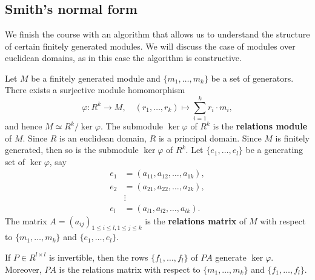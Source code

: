 \section{}

\subsection{Smith's normal form}

We finish the course with an algorithm that allows us to understand the
structure of certain finitely generated modules.  We will discuss the case of
modules over euclidean domains, as in this case the algorithm is constructive. 


Let $M$ be a finitely generated module and $\{m_1,\dots,m_k\}$ be a set of
generators.  There exists a surjective module homomorphism 
\[
	\varphi\colon R^k\to M, 
	\quad
	(r_1,\dots,r_k)\mapsto \sum_{i=1}^k r_i\cdot m_i,
\]
and hence 
$M\simeq R^k/\ker\varphi$. 
The submodule $\ker\varphi$ of $R^k$ is the \textbf{relations module} of $M$. 
Since $R$ is an euclidean domain, $R$ is a principal domain. Since 
$M$ is finitely generated, then so is the submodule $\ker\varphi$ of $R^k$. Let 
$\{e_1,\dots,e_l\}$ be a generating set of $\ker\varphi$, say 
\begin{align*}
e_1&=(a_{11},a_{12},\dots,a_{1k}),\\
e_2&=(a_{21},a_{22},\dots,a_{2k}),\\
&\vdots\\
e_l&=(a_{l1},a_{l2},\dots,a_{lk}).	
\end{align*}
The matrix $A=(a_{ij})_{1\leq i\leq l,1\leq j\leq k}$ is the 
\textbf{relations matrix} of $M$ with respect to $\{m_1,\dots,m_k\}$ 
and $\{e_1,\dots,e_l\}$. 

\begin{claim}
		If $P\in R^{l\times l}$ is invertible, then the rows
		$\{f_1,\dots,f_l\}$ of $PA$ generate $\ker\varphi$. Moreover, $PA$ is
		the relations matrix with respect to $\{m_1,\dots,m_k\}$ and
		$\{f_1,\dots,f_l\}$. 
\end{claim}


